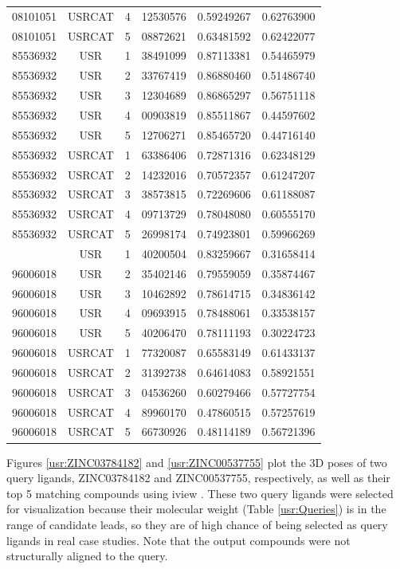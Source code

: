 \begin{longtable}{cccccc}
08101051 & USRCAT & 4 & 12530576 & 0.59249267 & 0.62763900\\
08101051 & USRCAT & 5 & 08872621 & 0.63481592 & 0.62422077\\
\hline
85536932 & USR    & 1 & 38491099 & 0.87113381 & 0.54465979\\%
85536932 & USR    & 2 & 33767419 & 0.86880460 & 0.51486740\\
85536932 & USR    & 3 & 12304689 & 0.86865297 & 0.56751118\\
85536932 & USR    & 4 & 00903819 & 0.85511867 & 0.44597602\\
85536932 & USR    & 5 & 12706271 & 0.85465720 & 0.44716140\\
85536932 & USRCAT & 1 & 63386406 & 0.72871316 & 0.62348129\\%
85536932 & USRCAT & 2 & 14232016 & 0.70572357 & 0.61247207\\
85536932 & USRCAT & 3 & 38573815 & 0.72269606 & 0.61188087\\
85536932 & USRCAT & 4 & 09713729 & 0.78048080 & 0.60555170\\
85536932 & USRCAT & 5 & 26998174 & 0.74923801 & 0.59966269\\
\hline
\pagebreak
96006018 & USR    & 1 & 40200504 & 0.83259667 & 0.31658414\\%
96006018 & USR    & 2 & 35402146 & 0.79559059 & 0.35874467\\
96006018 & USR    & 3 & 10462892 & 0.78614715 & 0.34836142\\
96006018 & USR    & 4 & 09693915 & 0.78488061 & 0.33538157\\
96006018 & USR    & 5 & 40206470 & 0.78111193 & 0.30224723\\
96006018 & USRCAT & 1 & 77320087 & 0.65583149 & 0.61433137\\%
96006018 & USRCAT & 2 & 31392738 & 0.64614083 & 0.58921551\\
96006018 & USRCAT & 3 & 04536260 & 0.60279466 & 0.57727754\\
96006018 & USRCAT & 4 & 89960170 & 0.47860515 & 0.57257619\\
96006018 & USRCAT & 5 & 66730926 & 0.48114189 & 0.56721396\\
\hline
\end{longtable}

Figures \ref{usr:ZINC03784182} and \ref{usr:ZINC00537755} plot the 3D poses of two query ligands, ZINC03784182 and ZINC00537755, respectively, as well as their top 5 matching compounds using iview \citep{1366}. These two query ligands were selected for visualization because their molecular weight (Table \ref{usr:Queries}) is in the range of candidate leads, so they are of high chance of being selected as query ligands in real case studies. Note that the output compounds were not structurally aligned to the query.

